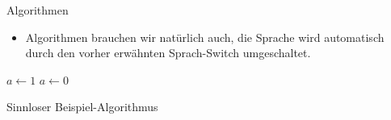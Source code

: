 \documentclass[hyperref={bookmarks=false},11pt,dvipsnames]{beamer}
\begin{document}
\begin{frame}[t]{Algorithmen}

	\begin{itemize}
		\item Algorithmen brauchen wir natürlich auch, die Sprache wird automatisch durch den vorher erwähnten Sprach-Switch umgeschaltet.
	\end{itemize}

	\begin{algorithm}[H]
		\DontPrintSemicolon
		\BlankLine
		$a \leftarrow 1$\;
		{
			$a \leftarrow 0$\;
		}
		\caption{Sinnloser Beispiel-Algorithmus}
	\end{algorithm}


\end{frame}
\end{document}
